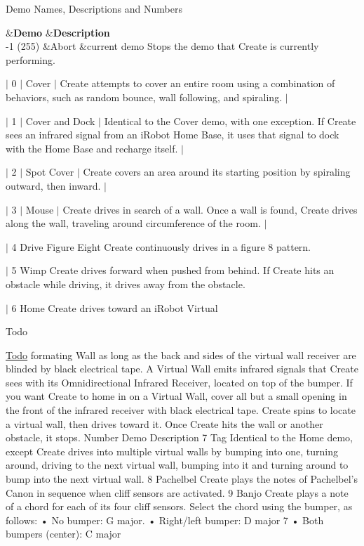 \begin{Desc}
\begin{description}
Demo Names, Descriptions and Numbers

\begin{TabularC}{3}
\hline
{}&{\bf Demo }&{\bf Description  }\\
-\/1 (255) &Abort &current demo Stops the demo that Create is currently performing. \\
\end{TabularC}
$\vert$ 0 $\vert$ Cover $\vert$ Create attempts to cover an entire room using a combination of behaviors, such as random bounce, wall following, and spiraling. $\vert$

$\vert$ 1 $\vert$ Cover and Dock $\vert$ Identical to the Cover demo, with one exception. If Create sees an infrared signal from an i\+Robot Home Base, it uses that signal to dock with the Home Base and recharge itself. $\vert$

$\vert$ 2 $\vert$ Spot Cover $\vert$ Create covers an area around its starting position by spiraling outward, then inward. $\vert$

$\vert$ 3 $\vert$ Mouse $\vert$ Create drives in search of a wall. Once a wall is found, Create drives along the wall, traveling around circumference of the room. $\vert$

$\vert$ 4 Drive Figure Eight Create continuously drives in a figure 8 pattern.

$\vert$ 5 Wimp Create drives forward when pushed from behind. If Create hits an obstacle while driving, it drives away from the obstacle.

$\vert$ 6 Home Create drives toward an i\+Robot Virtual \begin{DoxyRefDesc}{Todo}
\item[\hyperlink{todo__todo000001}{Todo}]formating Wall as long as the back and sides of the virtual wall receiver are blinded by black electrical tape. A Virtual Wall emits infrared signals that Create sees with its Omnidirectional Infrared Receiver, located on top of the bumper. If you want Create to home in on a Virtual Wall, cover all but a small opening in the front of the infrared receiver with black electrical tape. Create spins to locate a virtual wall, then drives toward it. Once Create hits the wall or another obstacle, it stops. Number Demo Description 7 Tag Identical to the Home demo, except Create drives into multiple virtual walls by bumping into one, turning around, driving to the next virtual wall, bumping into it and turning around to bump into the next virtual wall. 8 Pachelbel Create plays the notes of Pachelbel’s Canon in sequence when cliff sensors are activated. 9 Banjo Create plays a note of a chord for each of its four cliff sensors. Select the chord using the bumper, as follows\+: • No bumper\+: G major. • Right/left bumper\+: D major 7 • Both bumpers (center)\+: C major\end{DoxyRefDesc}



\end{description}
\end{Desc}
